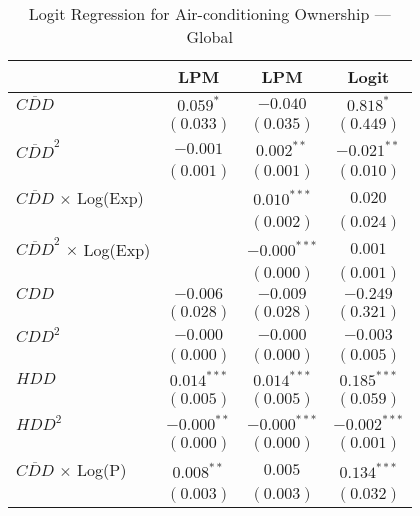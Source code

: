 
\begin{table}[H]
\caption{Logit Regression for Air-conditioning Ownership --- Global}
\begin{center}
\begin{tabular}{l c c c}
\hline
 & LPM & LPM & Logit \\
\hline
$\overline{CDD}$                     & $0.059^{*}$    & $-0.040$       & $0.818^{*}$      \\
                                     & $(0.033)$      & $(0.035)$      & $(0.449)$        \\
$\overline{CDD}^2$                   & $-0.001$       & $0.002^{**}$   & $-0.021^{**}$    \\
                                     & $(0.001)$      & $(0.001)$      & $(0.010)$        \\
$\overline{CDD}$ $\times$ Log(Exp)   &                & $0.010^{***}$  & $0.020$          \\
                                     &                & $(0.002)$      & $(0.024)$        \\
$\overline{CDD}^2$ $\times$ Log(Exp) &                & $-0.000^{***}$ & $0.001$          \\
                                     &                & $(0.000)$      & $(0.001)$        \\
$CDD$                                & $-0.006$       & $-0.009$       & $-0.249$         \\
                                     & $(0.028)$      & $(0.028)$      & $(0.321)$        \\
$CDD^2$                              & $-0.000$       & $-0.000$       & $-0.003$         \\
                                     & $(0.000)$      & $(0.000)$      & $(0.005)$        \\
$HDD$                                & $0.014^{***}$  & $0.014^{***}$  & $0.185^{***}$    \\
                                     & $(0.005)$      & $(0.005)$      & $(0.059)$        \\
$HDD^2$                              & $-0.000^{**}$  & $-0.000^{***}$ & $-0.002^{***}$   \\
                                     & $(0.000)$      & $(0.000)$      & $(0.001)$        \\
$\overline{CDD}$ $\times$ Log(P)     & $0.008^{**}$   & $0.005$        & $0.134^{***}$    \\
                                     & $(0.003)$      & $(0.003)$      & $(0.032)$        \\

\end{tabular}
\end{center}
\end{table}
